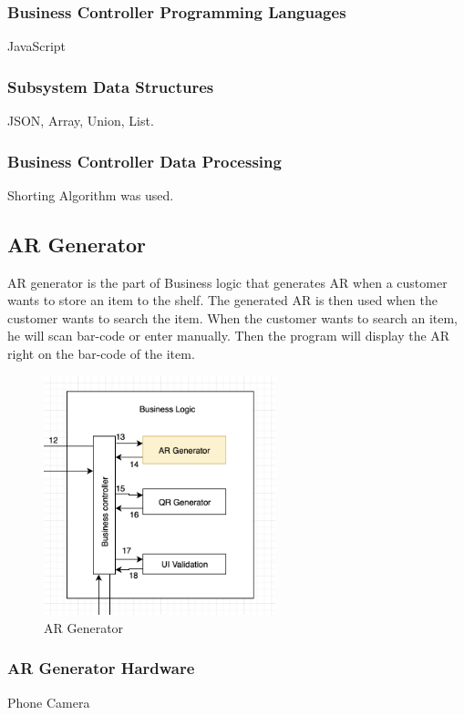 \subsubsection{Business Controller Programming Languages}
JavaScript

\subsubsection{Subsystem Data Structures}
JSON, Array, Union, List.

\subsubsection{Business Controller Data Processing}
Shorting Algorithm was used.

\subsection{AR Generator}
AR generator is the part of Business logic that generates AR when a customer wants to store an item to the shelf. The generated AR is then used when the customer wants to search the item. When the customer wants to search an item, he will scan bar-code or enter manually. Then the program will display the AR right on the bar-code of the item.
\begin{figure}[h!]
	\centering
 	\includegraphics[width=0.60\textwidth]{images/argenerator}
 \caption{AR Generator}
\end{figure}

\subsubsection{AR Generator Hardware}
Phone Camera

